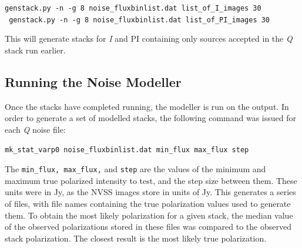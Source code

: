 \documentclass{article}
\begin{document}
\begin{center}
\verb!genstack.py -n -g 8 noise_fluxbinlist.dat list_of_I_images 30!\\
\verb! genstack.py -n -g 8 noise_fluxbinlist.dat list_of_PI_images 30!
\end{center}
\noindent
This will generate stacks for \emph{I} and PI containing only sources accepted
in the \emph{Q} stack run earlier.

\subsection{Running the Noise Modeller}
Once the stacks have completed running,  the modeller is run on the output.  In
order to generate a set of modelled stacks, the following command was issued
for each \emph{Q} noise file:
\begin{center}
\verb!mk_stat_varp0 noise_fluxbinlist.dat min_flux max_flux step!
\end{center}

The \verb!min_flux, max_flux,! and \verb!step! are the values of the minimum and
maximum true polarized intensity to test, and the step size between them.  
These units were in Jy, as the NVSS images store in units of Jy.  This generates
a series of files, with file names containing the true polarization values used
to generate them.  To obtain the most likely polarization for a given stack,
the median value of the observed polarizations stored in these files was 
compared to the observed stack polarization.  The closest result is the most 
likely true polarization.
\end{document}

